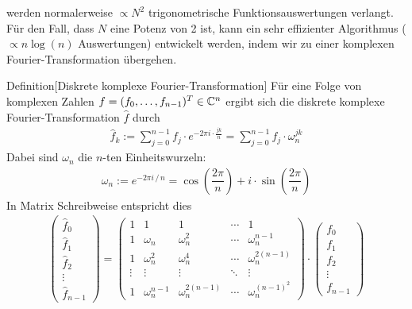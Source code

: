 werden normalerweise $\propto N^2$ trigonometrische Funktionsauswertungen verlangt. Für den Fall, dass $N$ eine 
Potenz von 2 ist, kann ein sehr effizienter Algorithmus ($\propto n\log(n)$ Auswertungen) entwickelt werden, 
indem wir zu einer komplexen Fourier-Transformation übergehen.


\begin{colbox}{Definition}[Diskrete komplexe Fourier-Transformation]
  Für eine Folge von komplexen Zahlen $f=(f_0,\dots,f_{n-1})^T\in\mathbb C^n$ ergibt sich die diskrete 
  komplexe Fourier-Transformation $\hat{f}$ durch
  \begin{align*}
    \hat{f}_k := \sum_{j=0}^{n-1} f_j\cdot e^{-2\pi i\cdot\frac{jk}{n}} = \sum_{j=0}^{n-1} f_j\cdot \omega_n^{jk}
  \end{align*}
  Dabei sind $\omega_n$ die $n$-ten Einheitswurzeln:
  \begin{align*}
    \omega_n := e^{-2\pi i \,/\,n} = \cos\left(\dfrac{2\pi}{n}\right)+i\cdot\sin\left(\dfrac{2\pi}{n}\right)
  \end{align*}
  In Matrix Schreibweise entspricht dies 
  \begin{align*}
    \begin{pmatrix}
      \hat{f}_0 \\
      \hat{f}_1 \\
      \hat{f}_2 \\
      \vdots \\
      \hat{f}_{n-1}
    \end{pmatrix}
    =
    \begin{pmatrix}
      1 & 1 & 1 & \cdots & 1 \\
      1 & \omega_n & \omega_n^2 & \cdots & \omega_n^{n-1} \\
      1 & \omega_n^2 & \omega_n^4 & \cdots & \omega_n^{2(n-1)} \\
      \vdots & \vdots & \vdots & \ddots & \vdots \\
      1 & \omega_n^{n-1} & \omega_n^{2(n-1)} & \cdots & \omega_n^{(n-1)^2}
    \end{pmatrix}
    \cdot
    \begin{pmatrix}
      f_0 \\
      f_1 \\
      f_2 \\
      \vdots \\
      f_{n-1}
    \end{pmatrix}
  \end{align*}
\end{colbox}


